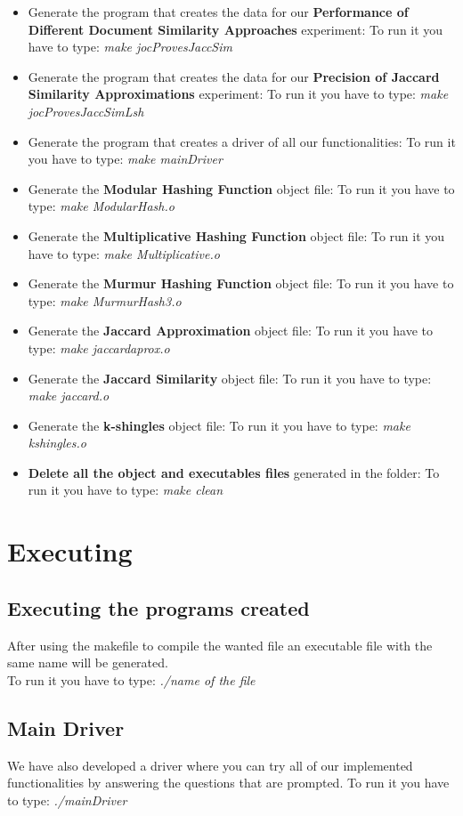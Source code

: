 \documentclass[12pt]{article}
\begin{document}
\begin{itemize}
\item Generate the program that creates the data for our \textbf{Performance of Different Document Similarity Approaches} experiment:
   To run it you have to type: \textit{make jocProvesJaccSim}
   \item Generate the program that creates the data for our \textbf{Precision of Jaccard Similarity Approximations} experiment:
   To run it you have to type: \textit{make jocProvesJaccSimLsh}
   \item Generate the program that creates a driver of all our functionalities:
   To run it you have to type: \textit{make mainDriver}
   \item Generate the \textbf{Modular Hashing Function} object file:
   To run it you have to type: \textit{make ModularHash.o} 
   \item Generate the \textbf{Multiplicative Hashing Function} object file:
   To run it you have to type: \textit{make Multiplicative.o}
   \item Generate the \textbf{Murmur Hashing Function} object file:
   To run it you have to type: \textit{make MurmurHash3.o}
   \item Generate the \textbf{Jaccard Approximation} object file:
   To run it you have to type: \textit{make jaccardaprox.o}
   \item Generate the \textbf{Jaccard Similarity} object file:
   To run it you have to type: \textit{make jaccard.o}
   \item Generate the \textbf{k-shingles} object file:
   To run it you have to type: \textit{make kshingles.o}
   \item \textbf{Delete all the object and executables files} generated in the folder:
   To run it you have to type: \textit{make clean}
   \end{itemize}
      \section{Executing}
         \subsection{Executing the programs created}
         After using the makefile to compile the wanted file an executable file with the same name will be generated.\\
         To run it you have to type:  \textit{./name of the file}
   \subsection{Main Driver}
   We have also developed a driver where you can try all of our implemented functionalities by answering the questions that are prompted.
   To run it you have to type:  \textit{./mainDriver}

   
   
\end{document}
